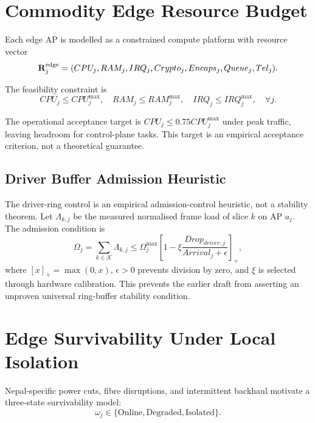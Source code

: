 \section{Commodity Edge Resource Budget}
\label{sec:edge-budget}

Each edge AP is modelled as a constrained compute platform with resource vector
\begin{equation}
  \mathbf{R}^{\mathrm{edge}}_j=(CPU_j,RAM_j,IRQ_j,Crypto_j,Encaps_j,Queue_j,Tel_j).
  \label{eq:resource-vector}
\end{equation}

The feasibility constraint is
\begin{equation}
  CPU_j\leq CPU_j^{\max},\quad RAM_j\leq RAM_j^{\max},\quad IRQ_j\leq IRQ_j^{\max},\quad \forall j.
  \label{eq:edge-resource-ceiling}
\end{equation}

The operational acceptance target is $CPU_j\leq0.75CPU_j^{\max}$ under peak traffic, leaving headroom for control-plane tasks. This target is an empirical acceptance criterion, not a theoretical guarantee.

\subsection{Driver Buffer Admission Heuristic}
\label{sec:ring-buffer}

The driver-ring control is an empirical admission-control heuristic, not a stability theorem. Let $\Lambda_{k,j}$ be the measured normalised frame load of slice $k$ on AP $a_j$. The admission condition is
\begin{equation}
  \Omega_j=\sum_{k\in\mathcal{K}}\Lambda_{k,j}
  \leq
  \Omega_j^{\max}
  \left[1-\xi\frac{Drop_{driver,j}}{Arrival_j+\epsilon}\right]_+,
  \label{eq:ring-buffer}
\end{equation}
where $[x]_+=\max(0,x)$, $\epsilon>0$ prevents division by zero, and $\xi$ is selected through hardware calibration. This prevents the earlier draft from asserting an unproven universal ring-buffer stability condition.

\section{Edge Survivability Under Local Isolation}
\label{sec:survivability}

Nepal-specific power cuts, fibre disruptions, and intermittent backhaul motivate a three-state survivability model:
\begin{equation}
  \omega_j\in\{\mathrm{Online},\mathrm{Degraded},\mathrm{Isolated}\}.
\end{equation}

